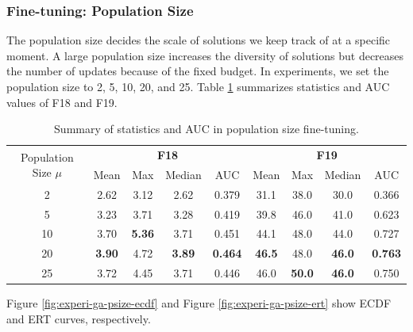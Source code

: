 \documentclass{article}
\begin{document}
\subsubsection{Fine-tuning: Population Size}
The population size decides the scale of solutions we keep track of at a specific moment. A large population size increases the diversity of solutions but decreases the number of updates because of the fixed budget. In experiments, we set the population size to 2, 5, 10, 20, and 25. Table \ref{tab:experi-ga-psize} summarizes statistics and AUC values of F18 and F19.

\begin{table}[!ht]
    \centering
    \caption{Summary of statistics and AUC in population size fine-tuning.}
    \label{tab:experi-ga-psize}
    \begin{tabular}{ccccccccc}
        \toprule
        \multirow{2}[3]{*}{Population Size $\mu$} &
        \multicolumn{4}{c}{\textbf{F18}} &
        \multicolumn{4}{c}{\textbf{F19}}\\
        \cmidrule(lr){2-5}
        \cmidrule(lr){6-9}
        & Mean & Max & Median & AUC & Mean & Max & Median & AUC\\
        \midrule
        2   & 2.62 & 3.12 & 2.62 & 0.379 & 31.1 & 38.0 & 30.0 & 0.366\\
        5   & 3.23 & 3.71 & 3.28 & 0.419 & 39.8 & 46.0 & 41.0 & 0.623\\
        10  & 3.70 & \textbf{5.36} & 3.71 & 0.451 & 44.1 & 48.0 & 44.0 & 0.727\\
        20  & \textbf{3.90} & 4.72 & \textbf{3.89} & \textbf{0.464} & \textbf{46.5} & 48.0 & \textbf{46.0} & \textbf{0.763}\\
        25  & 3.72 & 4.45 & 3.71 & 0.446 & 46.0 & \textbf{50.0} & \textbf{46.0} & 0.750\\
        \bottomrule
    \end{tabular}
\end{table}

Figure \ref{fig:experi-ga-psize-ecdf} and Figure \ref{fig:experi-ga-psize-ert} show ECDF and ERT curves, respectively.
\end{document}
